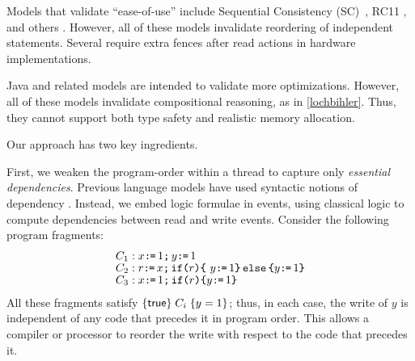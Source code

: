 Models that validate ``ease-of-use'' include Sequential Consistency (SC)~\citep{Lamport:1979:MMC:1311099.1311750}, RC11 \citep{DBLP:conf/pldi/LahavVKHD17}, and others \citep{Dolan:2018:BDR:3192366.3192421,DBLP:conf/pldi/LahavVKHD17,DBLP:conf/lics/JeffreyR16,Boehm:2014:OGA:2618128.2618134}.  However, all of these models invalidate reordering of independent statements.  Several require extra fences after read actions in hardware implementations. %


Java \citep{Manson:2005:JMM:1047659.1040336} and  related models \citep{DBLP:conf/esop/JagadeesanPR10,DBLP:conf/popl/KangHLVD17,DBLP:journals/pacmpl/ChakrabortyV19} are intended to validate more optimizations.  However, all of these models invalidate compositional reasoning, as in \eqref{lochbihler}.  Thus, they cannot support both type safety and realistic memory allocation.


Our approach has two key ingredients.  

First, we weaken the program-order within a thread to capture only \emph{essential dependencies}.
Previous language models have used syntactic notions of dependency \cite{Batty:2011:MCC:1926385.1926394}.
Instead, we embed logic formulae in events, using classical
\citet{Hoare:1969:ABC:363235.363259} logic to compute dependencies between read and write events. %
Consider the following  program fragments:
\begingroup
\allowdisplaybreaks
\begin{align*}
  & C_1: x \texttt{:}\mkern-1mu\texttt{=}\, 1 \texttt{;}\,\allowbreak y \texttt{:}\mkern-1mu\texttt{=}\, 1
  \\[-1ex] & C_2: r \texttt{:}\mkern-1mu\texttt{=}\, x \texttt{;}\,\allowbreak \texttt{if}\allowbreak\texttt{(}r\texttt{)} \allowbreak\texttt{\{}\ y \texttt{:}\mkern-1mu\texttt{=}\, 1 \texttt{\}}\,\allowbreak\texttt{else}\allowbreak\,\texttt{\{} y \texttt{:}\mkern-1mu\texttt{=}\, 1  \texttt{\}}
  \\[-1ex] & C_3: x \texttt{:}\mkern-1mu\texttt{=}\, 1 \texttt{;}\,\allowbreak \texttt{if}\allowbreak\texttt{(}r\texttt{)} \allowbreak\texttt{\{} y \texttt{:}\mkern-1mu\texttt{=}\, 1 \texttt{\}}
\end{align*}
\endgroup
All these fragments satisfy  $\{\mathsf{true}\}\allowbreak\;C_i\;\allowbreak\{y =1\}$; thus, in each case, the write of $y$ is independent of
any code that precedes it in program order.  This allows a compiler or processor to reorder the write with respect to the code that precedes it.

